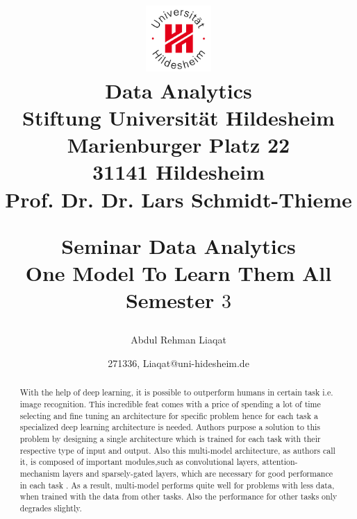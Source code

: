 \documentclass[12pt]{article}
\begin{document}
\title{
\begin{flushright}
\includegraphics[width=2.5cm]{logoUHi.jpg}\\
{\small
Data Analytics\\
Stiftung Universit{\"a}t Hildesheim\\
Marienburger Platz 22\\
31141 Hildesheim\\
Prof. Dr. Dr. Lars Schmidt-Thieme\\
}
\end{flushright}
\bigskip
\begin{center}
Seminar Data Analytics \uppercase\expandafter{\relax}\\
One Model To Learn Them All\\
Semester $3$
\end{center}
}
\author{Abdul Rehman Liaqat}
\date{271336, Liaqat@uni-hidesheim.de}
\maketitle

\newpage

\begin{abstract}
With the help of deep learning, it is possible to outperform humans in certain task i.e. image recognition. This incredible feat comes with a price of spending a lot of time selecting and fine tuning an architecture for specific problem hence for each task a specialized deep learning architecture is needed. Authors purpose a solution to this problem by designing a single architecture which is trained for each task with their respective type of input and output. Also this multi-model architecture, as authors call it, is composed of important modules,such as convolutional layers, attention-mechanism layers and sparsely-gated layers, which are necessary for good performance in each task . As a result, multi-model performs quite well for problems with less data, when trained with the data from other tasks. Also the performance for other tasks only degrades slightly.
\end{abstract}
\newpage
\tableofcontents
\newpage
\end{document}
